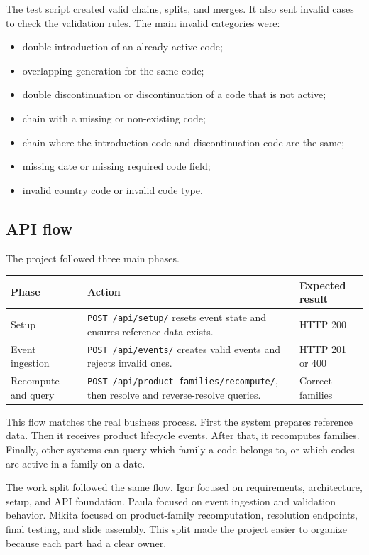 \documentclass[12pt]{article}
\begin{document}
The test script created valid chains, splits, and merges. It also sent invalid cases to check the validation rules. The main invalid categories were:

\begin{itemize}
  \item double introduction of an already active code;
  \item overlapping generation for the same code;
  \item double discontinuation or discontinuation of a code that is not active;
  \item chain with a missing or non-existing code;
  \item chain where the introduction code and discontinuation code are the same;
  \item missing date or missing required code field;
  \item invalid country code or invalid code type.
\end{itemize}

\subsection{API flow}

The project followed three main phases.

\begin{longtable}{|p{}|p{}|p{}|}
\hline
\textbf{Phase} & \textbf{Action} & \textbf{Expected result} \\
\hline
Setup & \texttt{POST /api/setup/} resets event state and ensures reference data exists. & HTTP 200 \\
\hline
Event ingestion & \texttt{POST /api/events/} creates valid events and rejects invalid ones. & HTTP 201 or 400 \\
\hline
Recompute and query & \texttt{POST /api/product-families/recompute/}, then resolve and reverse-resolve queries. & Correct families \\
\hline
\end{longtable}

This flow matches the real business process. First the system prepares reference data. Then it receives product lifecycle events. After that, it recomputes families. Finally, other systems can query which family a code belongs to, or which codes are active in a family on a date.

The work split followed the same flow. Igor focused on requirements, architecture, setup, and API foundation. Paula focused on event ingestion and validation behavior. Mikita focused on product-family recomputation, resolution endpoints, final testing, and slide assembly. This split made the project easier to organize because each part had a clear owner.
\end{document}
